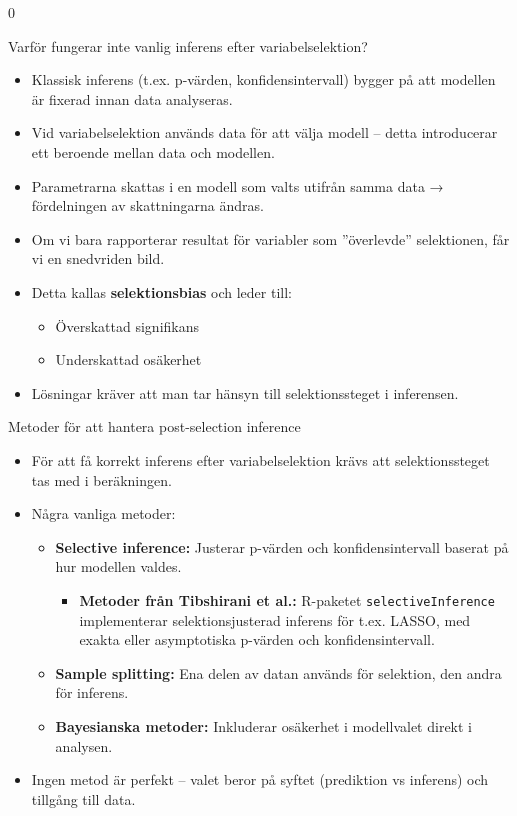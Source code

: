 0\documentclass[10pt,english]{beamer}
\begin{document}
\begin{frame}{Varför fungerar inte vanlig inferens efter variabelselektion?}
\begin{itemize}
    \item Klassisk inferens (t.ex. p-värden, konfidensintervall) bygger på att modellen är fixerad innan data analyseras.
    \item Vid variabelselektion används data för att välja modell – detta introducerar ett beroende mellan data och modellen.
    \item Parametrarna skattas i en modell som valts utifrån samma data → fördelningen av skattningarna ändras.
    \item Om vi bara rapporterar resultat för variabler som ”överlevde” selektionen, får vi en snedvriden bild.
    \item Detta kallas \textbf{selektionsbias} och leder till:
    \begin{itemize}
        \item Överskattad signifikans
        \item Underskattad osäkerhet
    \end{itemize}
    \item Lösningar kräver att man tar hänsyn till selektionssteget i inferensen.
\end{itemize}
\end{frame}

\begin{frame}{Metoder för att hantera post-selection inference}
\begin{itemize}
    \item För att få korrekt inferens efter variabelselektion krävs att selektionssteget tas med i beräkningen.
    \item Några vanliga metoder:
    \begin{itemize}
        \item \textbf{Selective inference:} Justerar p-värden och konfidensintervall baserat på hur modellen valdes.
        \begin{itemize}
          \item \textbf{Metoder från Tibshirani et al.:} R-paketet \texttt{selectiveInference} implementerar selektionsjusterad inferens för t.ex. LASSO, med exakta eller asymptotiska p-värden och konfidensintervall.
        \end{itemize}
        \item \textbf{Sample splitting:} Ena delen av datan används för selektion, den andra för inferens.
         \item \textbf{Bayesianska metoder:} Inkluderar osäkerhet i modellvalet direkt i analysen.
    \end{itemize}
    \item Ingen metod är perfekt – valet beror på syftet (prediktion vs inferens) och tillgång till data.
\end{itemize}
\end{frame}
\end{document}
